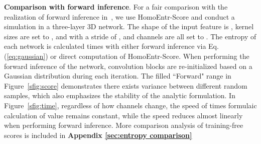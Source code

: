 \documentclass{article} \usepackage{iclr2023_conference,times}
\begin{document}
\noindent\textbf{Comparison with forward inference}.
For a fair comparison with the realization of forward inference in~\citep{sun2022mae}, we use HomoEntr-Score and conduct a simulation in a three-layer 3D network.
The shape of the input feature is , kernel sizes are set to ,  and  with a stride of , and channels are all set to . 
The entropy of each network is calculated  times with either forward inference via Eq. (\ref{eq:gaussian}) or direct computation of HomoEntr-Score. 
When performing the forward inference of the network, convolution blocks are re-initialized based on a Gaussian distribution during each iteration.
The filled “Forward" range in Figure~\ref{sfig:score} demonstrates there exists variance between different random samples, which also emphasizes the stability of the analytic formulation. In Figure~\ref{sfig:time}, regardless of how channels change, the speed of  times formulaic calculation of value remains constant, while the speed reduces almost linearly when performing forward inference. More comparison analysis of training-free scores is included in \textbf{Appendix \ref{sec:entropy comparison}}
\end{document}
